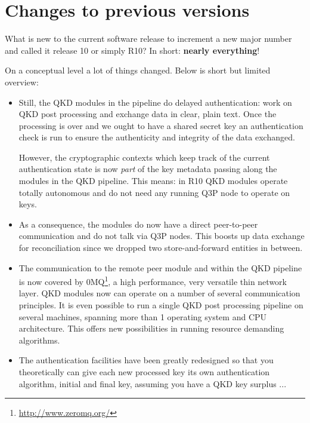 \section{Changes to previous versions}
\label{sec:Changes to previous versions}

What is new to the current software release to increment a new major number and called it release 10 or simply R10? In short: \textbf{nearly everything}!

\medskip

On a conceptual level a lot of things changed. Below is short but limited overview:

\begin{itemize}

    \item Still, the QKD modules in the pipeline do delayed authentication: work on QKD post processing and exchange data in clear, plain text. Once the processing is over and we ought to have a shared secret key an authentication check is run to ensure the authenticity and integrity of the data exchanged.
    
    However, the cryptographic contexts which keep track of the current authentication state is now \emph{part} of the key metadata passing along the modules in the QKD pipeline. This means: in R10 QKD modules operate totally autonomous and do not need any running Q3P node to operate on keys. 
    
    \item As a consequence, the modules do now have a direct peer-to-peer communication and do not talk via Q3P nodes. This boosts up data exchange for reconciliation since we dropped two store-and-forward entities in between. 
    
    \item The communication to the remote peer module and within the QKD pipeline is now covered by 0MQ\footnote{\url{http://www.zeromq.org/}}, a high performance, very versatile thin network layer. QKD modules now can operate on a number of several communication principles. It is even possible to run a single QKD post processing pipeline on several machines, spanning more than 1 operating system and CPU architecture. This offers new possibilities in running resource demanding algorithms.
    
    \item The authentication facilities have been greatly redesigned so that you theoretically can give each new processed key its own authentication algorithm, initial and final key, assuming you have a QKD key surplus ...
    

\end{itemize}
